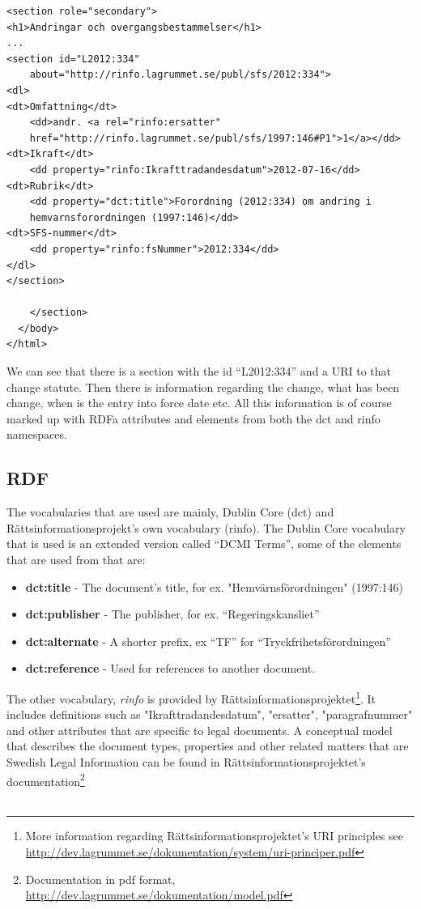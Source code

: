 \begin{verbatim}
<section role="secondary">
<h1>Andringar och overgangsbestammelser</h1>
...
<section id="L2012:334" 
    about="http://rinfo.lagrummet.se/publ/sfs/2012:334">
<dl>
<dt>Omfattning</dt>
    <dd>andr. <a rel="rinfo:ersatter"
    href="http://rinfo.lagrummet.se/publ/sfs/1997:146#P1">1</a></dd>
<dt>Ikraft</dt>
    <dd property="rinfo:Ikrafttradandesdatum">2012-07-16</dd>
<dt>Rubrik</dt>
    <dd property="dct:title">Forordning (2012:334) om andring i 
    hemvarnsforordningen (1997:146)</dd>
<dt>SFS-nummer</dt>
    <dd property="rinfo:fsNummer">2012:334</dd>
</dl>
</section>

    </section>
  </body>
</html>
\end{verbatim}
\linebreak
\newline
We can see that there is a section with the id “L2012:334” and a URI to that change statute. Then there is information regarding the change, what has been change, when is the entry into force date etc. All this information is of course marked up with RDFa attributes and elements from both the dct and rinfo namespaces. 
 
\subsection{RDF}
The vocabularies that are used are mainly, Dublin Core (dct) and Rättsinformationsprojekt's own vocabulary (rinfo). The Dublin Core vocabulary that is used is an extended version called “DCMI Terms”, some of the elements that are used from that are:\\ 
\begin{itemize}
\item \textbf{dct:title} - The document's title, for ex. "Hemvärnsförordningen" (1997:146)
\item \textbf{dct:publisher} - The publisher, for ex. “Regeringskansliet”
\item \textbf{dct:alternate} - A shorter prefix, ex “TF” for “Tryckfrihetsförordningen”
\item \textbf{dct:reference} - Used for references to another document. 
\end{itemize}
The other vocabulary, \textit{rinfo} is provided by Rättsinformationsprojektet\footnote{More information regarding Rättsinformationsprojektet's URI principles see \url{http://dev.lagrummet.se/dokumentation/system/uri-principer.pdf}}. It includes definitions such as "Ikrafttradandesdatum", "ersatter", "paragrafnummer" and other attributes that are specific to legal documents. A conceptual model that describes the document types, properties and other related matters that are Swedish Legal Information can be found in Rättsinformationsprojektet's documentation\footnote{Documentation in pdf format, \url{http://dev.lagrummet.se/dokumentation/model.pdf}}\\\\


